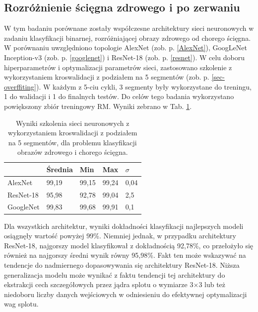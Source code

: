 \subsection{Rozróżnienie ścięgna zdrowego i po zerwaniu}
\label{binaryMRI}
W tym badaniu porównane zostały współczesne architektury sieci neuronowych w zadaniu klasyfikacji binarnej, rozróżniającej obrazy zdrowego od chorego ścięgna. W porównaniu uwzględniono topologie AlexNet (zob. p. \ref{AlexNet}), GoogLeNet Inception-v3 (zob. p. \ref{googlenet}) i ResNet-18 (zob. p. \ref{resnet}). W celu doboru hiperparametrów i optymalizacji parametrów sieci, zastosowano szkolenie z wykorzystaniem kroswalidacji z podziałem na 5 segmentów (zob. p. \ref{sec-overffiting}). W każdym z 5-ciu cykli, 3 segmenty były wykorzystane do treningu, 1 do walidacji i 1 do finalnych testów. Do celów tego badania wykorzystano powiększony zbiór treningowy RM. Wyniki zebrano w Tab. \ref{tab:binary-cross-validation}.
\vspace{10px}
\renewcommand{\arraystretch}{1.2}
\begin{table}[h!]
	\setlength{\tabcolsep}{14pt}
	\centering
	\caption{Wyniki szkolenia sieci neuronowych z wykorzystaniem kroswalidacji z podziałem na 5 segmentów, dla problemu klasyfikacji obrazów zdrowego i chorego ścięgna.}
	\label{tab:binary-cross-validation}
	\begin{tabular}{l | l | l | l | l }
		 & Średnia & Min   & Max   & $\sigma$   \\ \hline \hline
		AlexNet   & 99,19 & 99,15 & 99,24 & 0,04 \\ \hline
		ResNet-18 & 95,98 & 92,78 & 99,04 & 2,5  \\ \hline
		GoogleNet & 99,83 & 99,68 & 99,91 & 0,1  \\ \hline
	\end{tabular}
\end{table}
\renewcommand{\arraystretch}{1}

Dla wszystkich architektur, wyniki dokładności klasyfikacji najlepszych modeli osiągnęły wartość powyżej 99\%. Niemniej jednak, w przypadku architektury ResNet-18, najgorszy model klasyfikował z dokładnością 92,78\%, co przełożyło się również na najgorszy średni wynik równy 95,98\%. Fakt ten może wskazywać na tendencje \linebreak do nadmiernego dopasowywania się architektury ResNet-18. Niższa generalizacja modelu może wynikać z faktu tendencji tej architektury do ekstrakcji cech szczegółowych przez jądra splotu o wymiarze 3$\times$3 lub też niedoboru liczby danych wejściowych w odniesieniu do efektywnej optymalizacji wag splotu.

